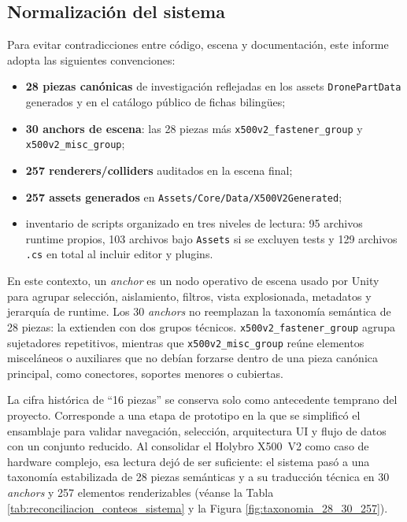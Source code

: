 \subsection{Normalización del sistema}

Para evitar contradicciones entre código, escena y documentación, este informe adopta las siguientes convenciones:

\begin{itemize}
    \item \textbf{28 piezas canónicas} de investigación reflejadas en los assets \texttt{DronePartData} generados y en el catálogo público de fichas bilingües;
    \item \textbf{30 anchors de escena}: las 28 piezas más \texttt{x500v2\_fastener\_group} y \texttt{x500v2\_misc\_group};
    \item \textbf{257 renderers/colliders} auditados en la escena final;
    \item \textbf{257 assets generados} en \texttt{Assets/Core/Data/X500V2Generated};
    \item inventario de scripts organizado en tres niveles de lectura: 95 archivos runtime propios, 103 archivos bajo \texttt{Assets} si se excluyen tests y 129 archivos \texttt{.cs} en total al incluir editor y plugins.
\end{itemize}

En este contexto, un \textit{anchor} es un nodo operativo de escena usado por Unity para agrupar selección, aislamiento, filtros, vista explosionada, metadatos y jerarquía de runtime. Los 30 \textit{anchors} no reemplazan la taxonomía semántica de 28 piezas: la extienden con dos grupos técnicos. \texttt{x500v2\_fastener\_group} agrupa sujetadores repetitivos, mientras que \texttt{x500v2\_misc\_group} reúne elementos misceláneos o auxiliares que no debían forzarse dentro de una pieza canónica principal, como conectores, soportes menores o cubiertas.

La cifra histórica de ``16 piezas'' se conserva solo como antecedente temprano del proyecto. Corresponde a una etapa de prototipo en la que se simplificó el ensamblaje para validar navegación, selección, arquitectura UI y flujo de datos con un conjunto reducido. Al consolidar el Holybro X500~V2 como caso de hardware complejo, esa lectura dejó de ser suficiente: el sistema pasó a una taxonomía estabilizada de 28 piezas semánticas y a su traducción técnica en 30 \textit{anchors} y 257 elementos renderizables (véanse la Tabla \ref{tab:reconciliacion_conteos_sistema} y la Figura \ref{fig:taxonomia_28_30_257}).

